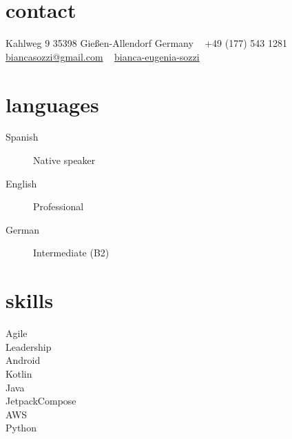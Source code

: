 \documentclass[a4paper,nocolors]{cv-friggeri-x}
\begin{document}


\begin{aside} %
\section{contact}
\pin \hfill Kahlweg 9
35398 Gießen-Allendorf
Germany
~
{\Large\textcolor{gray}{\Mobilefone}} \hfill +49 (177) 543 1281
\hfill \href{mailto:biancasozzi@gmail.com}{\footnotesize biancasozzi@gmail.com}
~
\llogo \hfill \href{https://www.linkedin.com/in/bianca-eugenia-sozzi}{bianca-eugenia-sozzi}
~
\section{languages}
\begin{description}
  \item[Spanish] \hfill Native speaker
  \item[English] \hfill Professional
  \item[German] \hfill Intermediate (B2)
\end{description}
\section{skills}
\begin{description} 
  \item[Agile] \hfill \filleddot \filleddot \filleddot \filleddot \filleddot
  \item[Leadership] \hfill \filleddot \filleddot \filleddot \emptydot \emptydot
  \item[Android] \hfill \filleddot \filleddot \filleddot \emptydot \emptydot
  \item[Kotlin] \hfill \filleddot \filleddot \filleddot \emptydot \emptydot
  \item[Java] \hfill \filleddot \filleddot \filleddot \emptydot \emptydot
  \item[JetpackCompose] \hfill \filleddot \filleddot \emptydot \emptydot \emptydot
  \item[AWS] \hfill \filleddot \filleddot \emptydot \emptydot \emptydot
  \item[Python] \hfill \filleddot \filleddot \emptydot \emptydot \emptydot
\end{description}
\end{aside}
\end{document}

